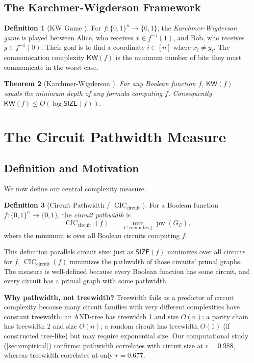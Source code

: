 \documentclass[11pt]{article}
\theoremstyle{plain}
\newtheorem{theorem}{Theorem}[section]
\theoremstyle{definition}
\newtheorem{definition}[theorem]{Definition}
\newcommand{\pw}{\operatorname{pw}}
\newcommand{\CIC}{\operatorname{CIC}}
\newcommand{\CICcirc}{\CIC_{\text{circuit}}}
\newcommand{\SIZE}{\mathsf{SIZE}}
\newcommand{\KW}{\mathsf{KW}}
\newcommand{\set}[1]{\{#1\}}
\begin{document}
\subsection{The Karchmer-Wigderson Framework}

\begin{definition}[KW Game \cite{KarchmerWigderson88}]\label{def:kw}
For $f : \set{0,1}^n \to \set{0,1}$, the \emph{Karchmer-Wigderson game} is played between Alice, who receives $x \in f^{-1}(1)$, and Bob, who receives $y \in f^{-1}(0)$. Their goal is to find a coordinate $i \in [n]$ where $x_i \neq y_i$. The communication complexity $\KW(f)$ is the minimum number of bits they must communicate in the worst case.
\end{definition}

\begin{theorem}[Karchmer-Wigderson \cite{KarchmerWigderson88}]\label{thm:kw-classic}
For any Boolean function $f$, $\KW(f)$ equals the minimum depth of any formula computing $f$. Consequently $\KW(f) \leq O(\log \SIZE(f))$.
\end{theorem}


\section{The Circuit Pathwidth Measure}\label{sec:measure}

\subsection{Definition and Motivation}

We now define our central complexity measure.

\begin{definition}[Circuit Pathwidth / $\CICcirc$]\label{def:cic-circuit}
For a Boolean function $f : \set{0,1}^n \to \set{0,1}$, the \emph{circuit pathwidth} is
\[
\CICcirc(f) \;=\; \min_{C \text{ computes } f} \pw(G_C),
\]
where the minimum is over all Boolean circuits computing $f$.
\end{definition}

This definition parallels circuit size: just as $\SIZE(f)$ minimizes over all circuits for $f$, $\CICcirc(f)$ minimizes the pathwidth of those circuits' primal graphs. The measure is well-defined because every Boolean function has some circuit, and every circuit has a primal graph with some pathwidth.

\textbf{Why pathwidth, not treewidth?} Treewidth fails as a predictor of circuit complexity because many circuit families with very different complexities have constant treewidth: an AND-tree has treewidth 1 and size $O(n)$; a parity chain has treewidth 2 and size $O(n)$; a random circuit has treewidth $O(1)$ (if constructed tree-like) but may require exponential size. Our computational study (\cref{sec:empirical}) confirms: pathwidth correlates with circuit size at $r = 0.988$, whereas treewidth correlates at only $r = 0.677$.
\end{document}
